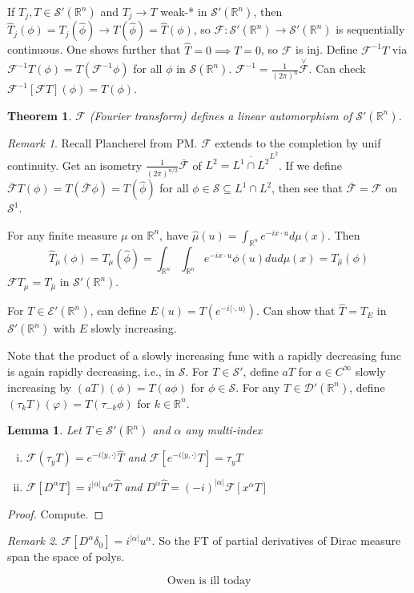 \documentclass{article}
\theoremstyle{definition}
\theoremstyle{remark}
\newtheorem{rem}{Remark}
\theoremstyle{plain}
\newtheorem{lem}[defn]{Lemma}
\newtheorem{thm}[defn]{Theorem}
\newcommand{\RR}{\mathbb{R}}
\begin{document}
If $T_j, T\in\mathcal S'(\RR^n)$ and $T_j\to T$ weak-* in $\mathcal S'(\RR^n)$, then $\hat T_j(\phi)=T_j(\hat\phi)\to T(\hat\phi)=\hat T(\phi)$, so $\mathcal F:\mathcal S'(\RR^n)\to \mathcal S'(\RR^n)$ is sequentially continuous.
One shows further that $\hat T=0\implies T=0$, so $\mathcal F$ is inj. Define $\mathcal F^{-1}T$ via $\mathcal F^{-1}T(\phi)=T(\mathcal F^{-1}\phi)$ for all $\phi$ in $\mathcal S(\RR^n)$. $\mathcal F^{-1}=\frac{1}{(2\pi)^n}\overset{\vee}{\mathcal F}$. Can check $\mathcal F^{-1}[\mathcal FT](\phi)=T(\phi)$.
\begin{thm}
    $\mathcal F$ (Fourier transform) defines a linear automorphism of $\mathcal S'(\RR^n)$.
\end{thm}
\begin{rem}
    Recall Plancherel from PM. $\mathcal F$ extends to the completion by unif continuity. Get an isometry $\frac{1}{(2\pi)^{n/2}}\bar{\mathcal F}$ of $L^2=\overline{L^1\cap L^2}^{L^2}$. If we define $\bar{\mathcal F}T(\phi)=T(\bar{\mathcal F}\phi)=T(\hat\phi)$ for all $\phi\in\mathcal S\subseteq L^1\cap L^2$, then see that $\bar{\mathcal F}=\mathcal F$ on $\mathcal S^1$.

    For any finite measure $\mu$ on $\RR^n$, have $\hat\mu(u)=\int_{\RR^n}e^{-ix\cdot u}d\mu(x)$. Then
    \[\hat T_\mu(\phi)=T_\mu(\hat\phi)=\int_{\RR^n}\int_{\RR^n}e^{-ix\cdot u}\phi(u)dud\mu(x)=T_{\hat\mu}(\phi)\] $\mathcal FT_\mu=T_{\hat\mu}$ in $\mathcal S'(\RR^n)$.

    For $T\in\mathcal E'(\RR^n)$, can define $E(u)=T(e^{-i\langle\cdot,u\rangle})$. Can show that $\hat T= T_E$ in $\mathcal S'(\RR^n)$ with $E$ slowly increasing.
\end{rem}

Note that the product of a slowly increasing func with a rapidly decreasing func is again rapidly decreasing, i.e., in $\mathcal S$. For $T\in \mathcal S'$, define $aT$ for $a\in C^\infty$ slowly increasing by $(aT)(\phi)=T(a\phi)$ for $\phi\in\mathcal S$. For any $T\in\mathcal D'(\RR^n)$, define $(\tau_kT)(\varphi)=T(\tau_{-k}\phi)$ for $k\in\RR^n$.

\begin{lem}
    Let $T\in\mathcal S'(\RR^n)$ and $\alpha$ any multi-index \begin{enumerate}[(i)]
        \item $\mathcal F(\tau_y T)=e^{-i\langle y,\cdot\rangle}\hat T$ and $\mathcal F[e^{-i\langle y,\cdot\rangle}T]=\tau_y T$
        \item $\mathcal F[D^\alpha T]=i^{|\alpha|}u^\alpha\hat T$ and $D^\alpha\hat T=(-i)^{|\alpha|}\mathcal F[x^\alpha T]$
    \end{enumerate}
\end{lem}
\begin{proof}
    Compute.
\end{proof}
\begin{rem}
    $\mathcal F[D^\alpha\delta_0]=i^{|\alpha|}u^\alpha$. So the FT of partial derivatives of Dirac measure span the space of polys.
\end{rem}
\[\text{Owen is ill today}\]
\end{document}
